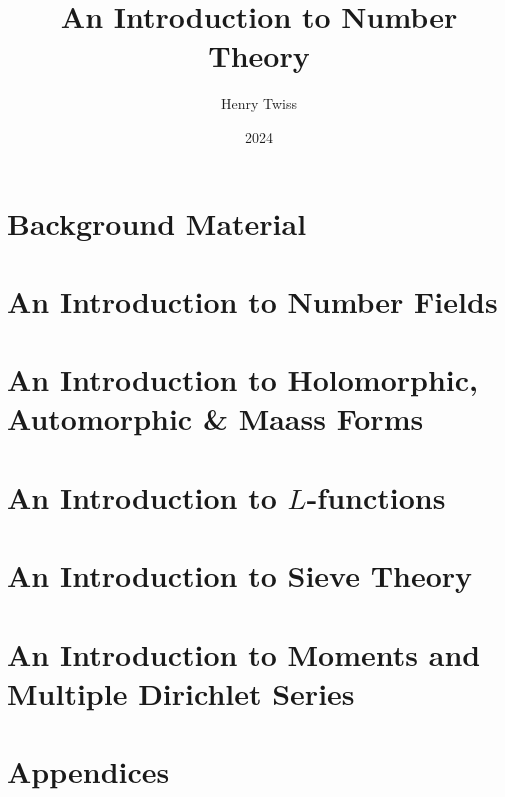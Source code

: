 \documentclass[12pt,oneside]{book}
\title{An Introduction to Number Theory}
\author{Henry Twiss}
\date{2024}
\begin{document}
\maketitle
\pagestyle{empty}
\tableofcontents
\setcounter{page}{0}
\pagestyle{fancy}

\part{Background Material}
  

\part{An Introduction to Number Fields}
  

\part{An Introduction to Holomorphic, Automorphic \& Maass Forms}
  
  
  
  

\part{An Introduction to \texorpdfstring{$L$}{L}-functions}
  
  
  

\part{An Introduction to Sieve Theory}
  
  

\part{An Introduction to Moments and Multiple Dirichlet Series}
  
  

\part{Appendices}
  

\printindex


\end{document}
